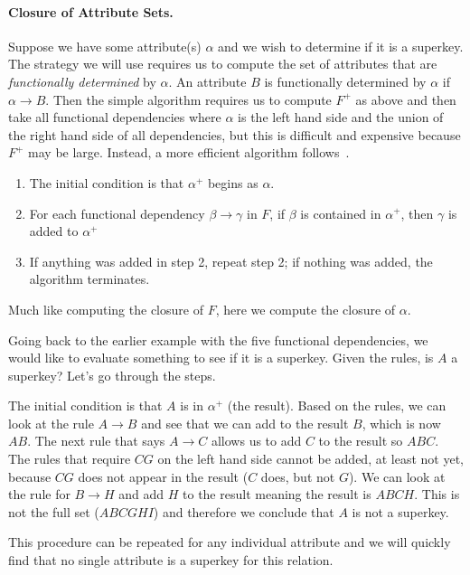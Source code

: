 \paragraph{Closure of Attribute Sets.} Suppose we have some attribute(s) $\alpha$ and we wish to determine if it is a superkey. The strategy we will use requires us to compute the set of attributes that are \textit{functionally determined} by $\alpha$. An attribute $B$ is functionally determined by $\alpha$ if $\alpha \rightarrow B$. Then the  simple algorithm requires us to compute $F^{+}$ as above and then take all functional dependencies where $\alpha$ is the left hand side and the union of the right hand side of all dependencies, but this is difficult and expensive because $F^{+}$ may be large. Instead, a more efficient algorithm follows~\cite{dsc}.

\begin{enumerate}
	\item The initial condition is that $\alpha^{+}$ begins as $\alpha$.
	\item For each functional dependency $\beta \rightarrow \gamma$ in $F$,
		if $\beta$ is contained in $\alpha^{+}$, then $\gamma$ is added to $\alpha^{+}$
	\item If anything was added in step 2, repeat step 2; if nothing was added, the algorithm terminates.
\end{enumerate}

Much like computing the closure of $F$, here we compute the closure of $\alpha$. 

Going back to the earlier example with the five functional dependencies, we would like to evaluate something to see if it is a superkey. Given the rules, is $A$ a superkey? Let's go through the steps. 

The initial condition is that $A$ is in $\alpha^{+}$ (the result). Based on the rules, we can look at the rule $A \rightarrow B$ and see that we can add to the result $B$, which is now $AB$. The next rule that says $A \rightarrow C$ allows us to add $C$ to the result so $ABC$. The rules that require $CG$ on the left hand side cannot be added, at least not yet, because $CG$ does not appear in the result ($C$ does, but not $G$). We can look at the rule for $B \rightarrow H$ and add $H$ to the result meaning the result is $ABCH$. This is not the full set ($ABCGHI$) and therefore we conclude that $A$ is not a superkey.

This procedure can be repeated for any individual attribute and we will quickly find that no single attribute is a superkey for this relation.




